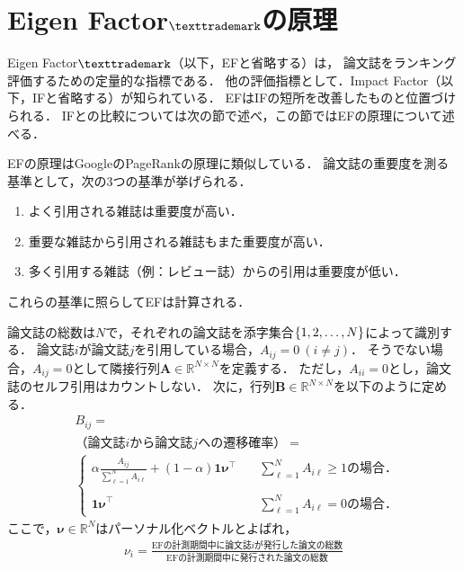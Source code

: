 
\section{Eigen Factor$\texttrademark$の原理}
Eigen Factor$\texttrademark$（以下，EFと省略する）は，
論文誌をランキング評価するための定量的な指標である．
他の評価指標として．Impact Factor（以下，IFと省略する）が知られている．
EFはIFの短所を改善したものと位置づけられる．
IFとの比較については次の節で述べ，この節ではEFの原理について述べる．
\par
EFの原理はGoogleのPageRankの原理に類似している．
論文誌の重要度を測る基準として，次の3つの基準が挙げられる．
\begin{enumerate}
    \item よく引用される雑誌は重要度が高い．
    \item 重要な雑誌から引用される雑誌もまた重要度が高い．
    \item 多く引用する雑誌（例：レビュー誌）からの引用は重要度が低い．
\end{enumerate}
これらの基準に照らしてEFは計算される．
\par
論文誌の総数は$N$で，それぞれの論文誌を添字集合$\lbrace 1,2,\ldots,N \rbrace$によって識別する．
論文誌$i$が論文誌$j$を引用している場合，$A_{ij}=0~(i\neq j)$．
そうでない場合，$A_{ij}=0$として隣接行列$\bm{A} \in \mathbb{R}^{N \times N}$を定義する．
ただし，$A_{ii}=0$とし，論文誌のセルフ引用はカウントしない．
次に，行列$\bm{B} \in \mathbb{R}^{N \times N}$を以下のように定める．
\begin{align*}
    & B_{ij} = \\
    & \text{（論文誌$i$から論文誌$j$への遷移確率）} = \\
    & \begin{cases}
        \alpha \frac{A_{ij}}{\sum_{\ell=1}^N A_{i\ell}} + (1-\alpha) \bm{1}\bm{\nu}^{\top}
        &\quad \sum_{\ell=1}^N A_{i\ell} \geq 1\text{の場合．} \\
        \\
        \bm{1}\bm{\nu}^{\top}
        &\quad \sum_{\ell=1}^N A_{i\ell} =0\text{の場合．} 
    \end{cases}
\end{align*}
ここで，$\bm{\nu} \in \mathbb{R}^N$はパーソナル化ベクトルとよばれ，
\begin{align*}
    \nu_i = 
    \frac{\text{EFの計測期間中に論文誌$i$が発行した論文の総数}}{\text{EFの計測期間中に発行された論文の総数}}
\end{align*}
